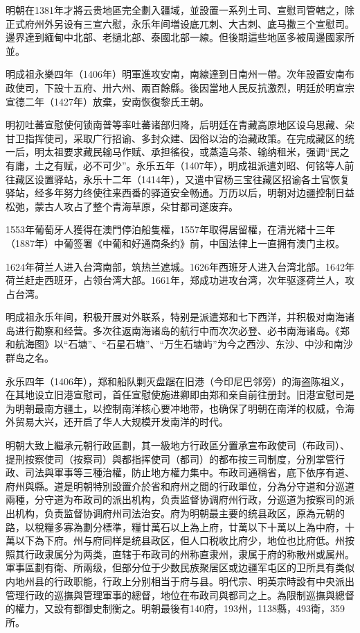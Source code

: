 明朝在1381年才將云贵地區完全劃入疆域，並設置一系列土司、宣慰司管轄之，除正式府州外另设有三宣六慰，永乐年间増设底兀刺、大古刺、底马撒三个宣慰司。邊界達到緬甸中北部、老撾北部、泰國北部一線。但後期這些地區多被周邊國家所並。

明成祖永樂四年（1406年）明軍進攻安南，南線達到日南州一帶。次年設置安南布政使司，下設十五府、卅六州、兩百餘縣。後因當地人民反抗激烈，明廷於明宣宗宣德二年（1427年）放棄，安南恢復黎氏王朝。

明初吐蕃宣慰使何锁南普等率吐蕃诸部归降，后明廷在青藏高原地区设乌思藏、朵甘卫指挥使司，采取广行招谕、多封众建、因俗以治的治藏政策。在完成藏区的统一后，明太祖要求藏民输马作赋、承担徭役，或蒸造乌茶、输纳租米，强调“民之有庸，土之有赋，必不可少”。永乐五年（1407年），明成祖派遣刘昭、何铭等人前往藏区设置驿站，永乐十二年（1414年），又遣中官杨三宝往藏区招谕各土官恢复驿站，经多年努力终使往来西番的驿道安全畅通。万历以后，明朝对边疆控制日益松弛，蒙古人攻占了整个青海草原，朵甘都司遂废弃。

1553年葡萄牙人獲得在澳門停泊船隻權，1557年取得居留權，在清光緒十三年（1887年）中葡签署《中葡和好通商条约》前，中国法律上一直拥有澳门主权。

1624年荷兰人进入台湾南部，筑热兰遮城。1626年西班牙人进入台湾北部。1642年荷兰赶走西班牙，占领台湾大部。1661年，郑成功进攻台湾，次年驱逐荷兰人，攻占台湾。

明成祖永乐年间，积极开展对外联系，特别是派遣郑和七下西洋，并积极对南海诸岛进行勘察和经营。多次往返南海诸岛的航行中而次次必登、必书南海诸岛。《郑和航海图》以“石塘”、“石星石塘”、“万生石塘屿”为今之西沙、东沙、中沙和南沙群岛之名。

永乐四年（1406年），郑和船队剿灭盘踞在旧港（今印尼巴邻旁）的海盗陈祖义，在其地设立旧港宣慰司，首任宣慰使施进卿即由郑和亲自前往册封。旧港宣慰司是为明朝最南方疆土，以控制南洋核心要冲地带，也确保了明朝在南洋的权威，令海外贸易大兴，还开启了华人大规模开发南洋的时代。

明朝大致上繼承元朝行政區劃，其一級地方行政區分置承宣布政使司（布政司）、提刑按察使司（按察司）與都指挥使司（都司）的都布按三司制度，分別掌管行政、司法與軍事等三種治權，防止地方權力集中。布政司通稱省，底下依序有道、府州與縣。道是明朝特別設置介於省和府州之間的行政單位，分為分守道和分巡道兩種，分守道为布政司的派出机构，负责监督协调府州行政，分巡道为按察司的派出机构，负责监督协调府州司法治安。府为明朝最主要的统县政区，原為元朝的路，以稅糧多寡為劃分標準，糧廿萬石以上為上府，廿萬以下十萬以上為中府，十萬以下為下府。州与府同样是统县政区，但人口税收比府少，地位也比府低。州按照其行政隶属分为两类，直辖于布政司的州称直隶州，隶属于府的称散州或属州。軍事區劃有衛、所兩级，但部分位于少数民族聚居区或边疆军屯区的卫所具有类似内地州县的行政职能，行政上分别相当于府与县。明代宗、明英宗時設有中央派出管理行政的巡撫與管理軍事的總督，地位在布政司與都司之上。為限制巡撫與總督的權力，又設有都御史制衡之。明朝最後有140府，193州，1138縣，493衛，359所。

